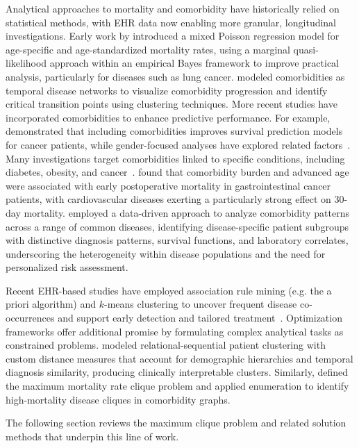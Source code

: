 Analytical approaches to mortality and comorbidity have historically
relied on statistical methods, with EHR data now enabling more
granular, longitudinal investigations. Early work by \cite{lu1996}
introduced a mixed Poisson regression model for age-specific and
age-standardized mortality rates, using a marginal quasi-likelihood
approach within an empirical Bayes framework to improve practical
analysis, particularly for diseases such as lung cancer.
\cite{LU2021113583} modeled comorbidities as temporal disease networks
to visualize comorbidity progression and identify critical transition
points using clustering techniques. More recent studies have
incorporated comorbidities to enhance predictive performance. For
example, \cite{ZOLBANIN2015150} demonstrated that including
comorbidities improves survival prediction models for cancer patients,
while gender-focused analyses have explored related
factors~\citep{Short2013S93}. Many investigations target comorbidities
linked to specific conditions, including diabetes, obesity, and
cancer~\citep{Holguin2005, Marrie2015, Leontiadis2013}.
\cite{vanGestel2013} found that comorbidity burden and advanced age
were associated with early postoperative mortality in gastrointestinal
cancer patients, with cardiovascular diseases exerting a particularly
strong effect on 30-day mortality. \cite{Koskinen2022} employed a
data-driven approach to analyze comorbidity patterns across a range of
common diseases, identifying disease-specific patient subgroups with
distinctive diagnosis patterns, survival functions, and laboratory
correlates, underscoring the heterogeneity within disease populations
and the need for personalized risk assessment.

Recent EHR-based studies have employed association rule mining (e.g. the a priori algorithm) and $k$-means clustering to uncover
frequent disease co-occurrences and support early detection and
tailored treatment~\citep{HariEtAl2024INFORMStutorial,Parisa2025}.
Optimization frameworks offer additional promise by formulating complex
analytical tasks as constrained problems. \cite{Zhong2022} modeled
relational-sequential patient clustering with custom distance measures
that account for demographic hierarchies and temporal diagnosis
similarity, producing clinically interpretable clusters. Similarly,
\cite{VaghfiMohebbi2025lethalclique} defined the maximum mortality
rate clique problem and applied enumeration to identify high-mortality
disease cliques in comorbidity graphs. 

The following section reviews the maximum clique problem and related solution methods that underpin this line of work.

